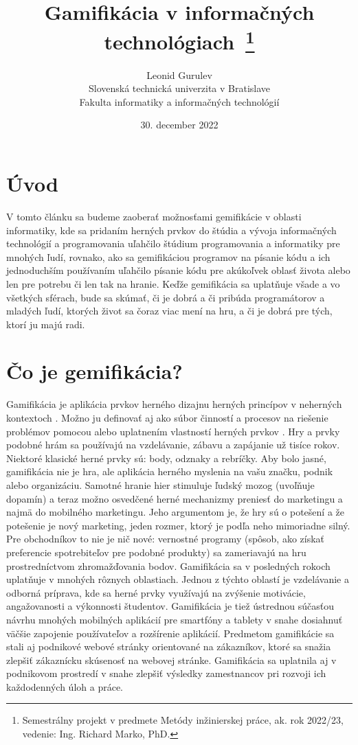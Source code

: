 \documentclass[14pt,a4paper]{article}
\title{Gamifikácia v informačných technológiach~\thanks{Semestrálny projekt v predmete Metódy inžinierskej práce, ak. rok 2022/23, vedenie: Ing. Richard Marko, PhD.}}
\author{Leonid Gurulev\\[2pt]
	{\small Slovenská technická univerzita v Bratislave}\\
	{\small Fakulta informatiky a informačných technológií}\\
	{\small \text{qgurulev@stuba.sk}}
	}
\date{\small 30. december 2022}
\begin{document}
\maketitle
\section{Úvod}
V tomto článku sa budeme zaoberať možnosťami gemifikácie v oblasti informatiky, 
kde sa pridaním herných prvkov do štúdia a vývoja informačných technológií 
a programovania uľahčilo štúdium programovania a informatiky pre mnohých ľudí, 
rovnako, ako sa gemifikáciou programov na písanie kódu 
a ich jednoduchším používaním uľahčilo písanie kódu pre 
akúkoľvek oblasť života alebo len pre potrebu 
či len tak na hranie. 
Keďže gemifikácia sa uplatňuje všade a vo všetkých sférach, 
bude sa skúmať, či je dobrá a či pribúda programátorov 
a mladých ľudí, ktorých život sa čoraz viac mení na hru, 
a či je dobrá pre tých, ktorí ju majú radi.




\section{Čo je gemifikácia?}
Gamifikácia je aplikácia prvkov herného dizajnu 
herných princípov v neherných kontextoch \cite{8166715}.
Možno ju definovať aj ako súbor činností a procesov na riešenie problémov 
pomocou alebo uplatnením vlastností herných prvkov \cite{gamify}.
Hry a prvky podobné hrám sa používajú na vzdelávanie, 
zábavu a zapájanie už tisíce rokov. Niektoré klasické herné prvky 
sú: body, odznaky a rebríčky.
Aby bolo jasné, gamifikácia nie je hra, 
ale aplikácia herného myslenia na vašu značku, podnik alebo organizáciu. 
Samotné hranie hier stimuluje ľudský mozog (uvoľňuje dopamín) a teraz možno osvedčené herné mechanizmy preniesť do marketingu a najmä do mobilného marketingu. Jeho argumentom je, že hry sú o potešení a že potešenie je nový marketing, jeden rozmer, ktorý je podľa neho mimoriadne silný.
Pre obchodníkov to nie je nič nové: vernostné programy (spôsob, 
ako získať preferencie spotrebiteľov pre podobné produkty) sa zameriavajú 
na hru prostredníctvom zhromažďovania bodov\cite{smarting}.
Gamifikácia sa v posledných rokoch uplatňuje v mnohých rôznych oblastiach. 
Jednou z týchto oblastí je vzdelávanie a odborná príprava, 
kde sa herné prvky využívajú na zvýšenie motivácie, 
angažovanosti a výkonnosti študentov. 
Gamifikácia je tiež ústrednou súčasťou návrhu mnohých 
mobilných aplikácií pre smartfóny a tablety v snahe 
dosiahnuť väčšie zapojenie používateľov a rozšírenie aplikácií. 
Predmetom gamifikácie sa stali aj podnikové webové 
stránky orientované na zákazníkov, 
ktoré sa snažia zlepšiť zákaznícku skúsenosť na webovej 
stránke. Gamifikácia sa uplatnila aj v podnikovom 
prostredí v snahe zlepšiť výsledky zamestnancov pri 
rozvoji ich každodenných úloh a práce\cite{gamifsoft}.
\end{document}
